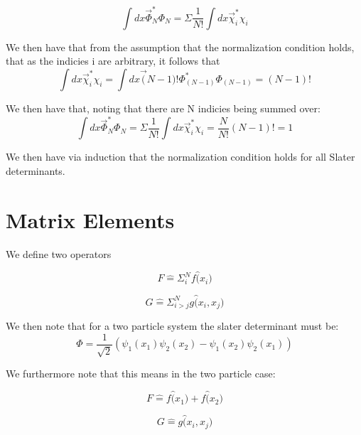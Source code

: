 \documentclass[11pt]{article} %
\begin{document}
\begin{equation}
\int dx\vec \Phi_N^* \Phi_N = \Sigma \frac{1}{N!} \int dx\vec \chi_i^*\chi_i
\end{equation}

We then have that from the assumption that the normalization condition holds, that as the indicies i are arbitrary, it follows that\\
\begin{equation}
 \int dx\vec \chi_i^*\chi_i=\int dx\vec (N-1)! \Phi_(N-1)^* \Phi_(N-1)=(N-1)!
\end{equation}	

We then have that, noting that there are N indicies being summed over:\\
\begin{equation}
\int dx\vec \Phi_N^* \Phi_N = \Sigma \frac{1}{N!} \int dx\vec \chi_i^*\chi_i=\frac{N}{N!}(N-1)!=1
\end{equation}

We then have via induction that the normalization condition holds for all Slater determinants.

\section{Matrix Elements}

We define two operators

\begin{equation}
F\hat=\Sigma_i^N f\hat(x_i)
\end{equation}

\begin{equation}
G\hat =\Sigma_{i>j}^N g\hat (x_i,x_j)
\end{equation}

We then note that for a two particle system the slater determinant must be:\\

\begin{equation}
\Phi=\frac{1}{\sqrt{2}}(\psi_1(x_1)\psi_2(x_2)-\psi_1(x_2)\psi_2(x_1))
\end{equation}

We furthermore note that this means in the two particle case:

\begin{equation}
F\hat=f\hat(x_1)+f\hat(x_2)
\end{equation}

\begin{equation}
G\hat=g\hat(x_i,x_j)
\end{equation}
\end{document}
